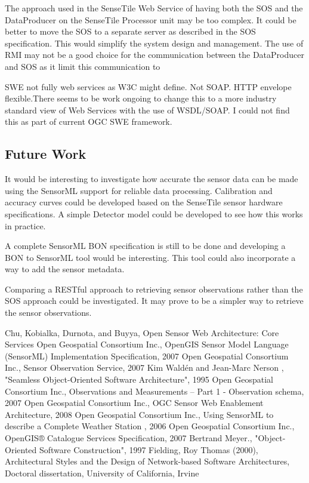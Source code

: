 \documentclass[]{final_report}
\begin{document}
The approach used in the SenseTile Web Service of having both the SOS and the DataProducer on the SenseTile Processor unit may be too complex. It could be better to move the SOS to a separate server as described in the SOS specification. This would simplify the system design and management. The use of RMI may not be a good choice for the communication between the DataProducer and SOS as it limit this communication to 

SWE not fully web services as W3C might define. Not SOAP. HTTP envelope
flexible.There seems to be work ongoing to change this to a more industry standard view of Web Services with the use of WSDL/SOAP. I could not find this as part of current OGC SWE framework.

\subsection{Future Work}
It would be interesting to investigate how accurate the sensor data can be made using the SensorML support for reliable data processing. Calibration and accuracy curves could be developed based on the SenseTile sensor hardware specifications. A simple Detector model could be developed to see how this works in practice.

A complete SensorML BON specification is still to be done and developing a BON to SensorML tool would be interesting.
This tool could also incorporate a way to add the sensor metadata.

Comparing a RESTful\cite{Restref} approach to retrieving sensor observations rather than the SOS approach could be investigated. It may prove to be a simpler way to retrieve the sensor observations.

\newpage
\begin{thebibliography}{99}
 Chu, Kobialka,  Durnota, and  Buyya, Open Sensor Web Architecture: Core Services
Open Geospatial Consortium Inc., OpenGIS Sensor Model Language (SensorML) Implementation Specification, 2007
Open Geospatial Consortium Inc.,  Sensor Observation Service, 2007
Kim Waldén and Jean-Marc Nerson , "Seamless Object-Oriented Software Architecture", 1995
Open Geospatial Consortium Inc., Observations and Measurements – Part 1 - Observation schema, 2007
Open Geospatial Consortium Inc., OGC Sensor Web Enablement Architecture, 2008
Open Geospatial Consortium Inc., Using SensorML to describe a
Complete Weather Station , 2006
Open Geospatial Consortium Inc., OpenGIS® Catalogue Services Specification, 2007
Bertrand Meyer., "Object-Oriented Software Construction", 1997
Fielding, Roy Thomas (2000), Architectural Styles and the Design of Network-based Software Architectures, Doctoral dissertation, University of California, Irvine

\end{thebibliography}
\end{document}
